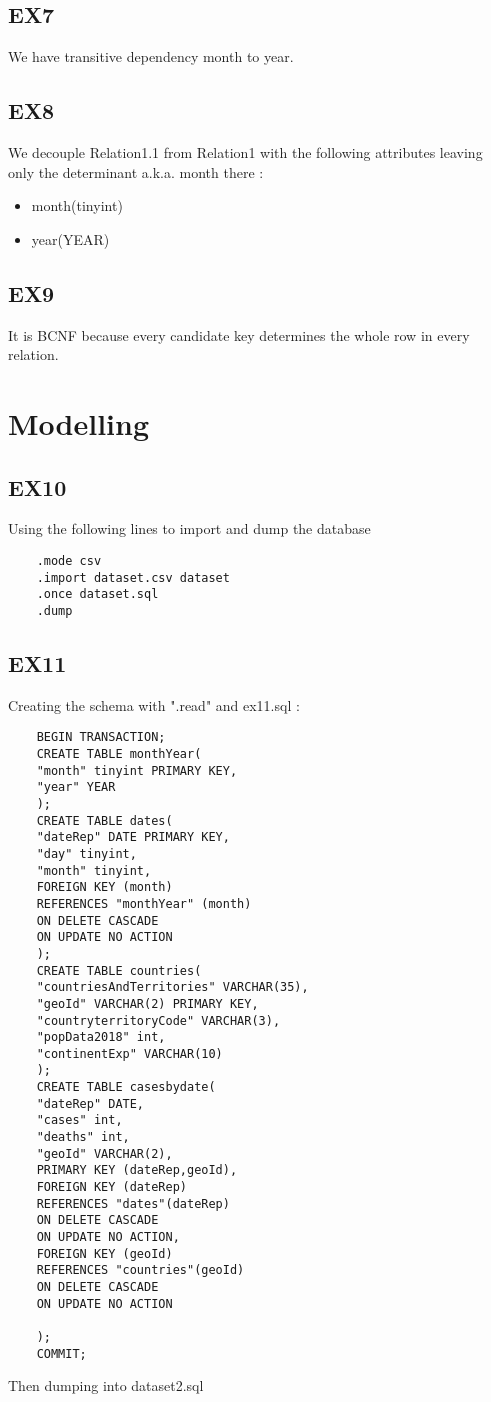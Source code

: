 \documentclass{article}
\begin{document}
\subsection{EX7}
We have transitive dependency month to year.
\subsection{EX8}
We decouple Relation1.1 from Relation1 with the following attributes leaving only the determinant a.k.a. month there :
\begin{itemize}
	\item month(tinyint)
	\item year(YEAR)
\end{itemize}  
\subsection{EX9}
It is BCNF because every candidate key determines the whole row in every relation.
\section{Modelling}
\subsection{EX10}
Using the following lines to import and dump the database
\begin{lstlisting}
	.mode csv
	.import dataset.csv dataset
	.once dataset.sql
	.dump
\end{lstlisting}
\subsection{EX11}
Creating the schema with ".read" and ex11.sql : 
\begin{lstlisting}
	BEGIN TRANSACTION;
	CREATE TABLE monthYear(
	"month" tinyint PRIMARY KEY,
	"year" YEAR
	);
	CREATE TABLE dates(
	"dateRep" DATE PRIMARY KEY,
	"day" tinyint,
	"month" tinyint,
	FOREIGN KEY (month)
	REFERENCES "monthYear" (month)
	ON DELETE CASCADE
	ON UPDATE NO ACTION
	);
	CREATE TABLE countries(
	"countriesAndTerritories" VARCHAR(35),
	"geoId" VARCHAR(2) PRIMARY KEY,
	"countryterritoryCode" VARCHAR(3),
	"popData2018" int,
	"continentExp" VARCHAR(10)
	);
	CREATE TABLE casesbydate(
	"dateRep" DATE,
	"cases" int,
	"deaths" int,
	"geoId" VARCHAR(2),
	PRIMARY KEY (dateRep,geoId),
	FOREIGN KEY (dateRep)
	REFERENCES "dates"(dateRep)
	ON DELETE CASCADE
	ON UPDATE NO ACTION,
	FOREIGN KEY (geoId)
	REFERENCES "countries"(geoId)
	ON DELETE CASCADE
	ON UPDATE NO ACTION
	
	);
	COMMIT;
\end{lstlisting}
Then dumping into dataset2.sql
\end{document}
